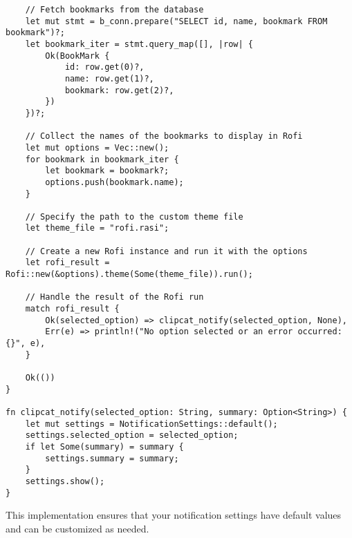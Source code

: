 \documentclass[11pt]{article}
\begin{document}
\begin{verbatim}
    // Fetch bookmarks from the database
    let mut stmt = b_conn.prepare("SELECT id, name, bookmark FROM bookmark")?;
    let bookmark_iter = stmt.query_map([], |row| {
        Ok(BookMark {
            id: row.get(0)?,
            name: row.get(1)?,
            bookmark: row.get(2)?,
        })
    })?;

    // Collect the names of the bookmarks to display in Rofi
    let mut options = Vec::new();
    for bookmark in bookmark_iter {
        let bookmark = bookmark?;
        options.push(bookmark.name);
    }

    // Specify the path to the custom theme file
    let theme_file = "rofi.rasi";

    // Create a new Rofi instance and run it with the options
    let rofi_result = Rofi::new(&options).theme(Some(theme_file)).run();

    // Handle the result of the Rofi run
    match rofi_result {
        Ok(selected_option) => clipcat_notify(selected_option, None),
        Err(e) => println!("No option selected or an error occurred: {}", e),
    }

    Ok(())
}

fn clipcat_notify(selected_option: String, summary: Option<String>) {
    let mut settings = NotificationSettings::default();
    settings.selected_option = selected_option;
    if let Some(summary) = summary {
        settings.summary = summary;
    }
    settings.show();
}

\end{verbatim}
This implementation ensures that your notification settings have default values and can be customized as needed.
\end{document}
